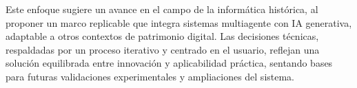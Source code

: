 Este enfoque sugiere un avance en el campo de la informática histórica, al proponer un marco replicable que integra sistemas multiagente con IA generativa, adaptable a otros contextos de patrimonio digital. Las decisiones técnicas, respaldadas por un proceso iterativo y centrado en el usuario, reflejan una solución equilibrada entre innovación y aplicabilidad práctica, sentando bases para futuras validaciones experimentales y ampliaciones del sistema.
